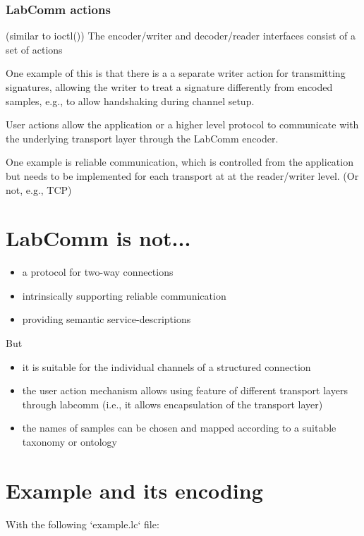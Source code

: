 \documentclass[a4paper]{article}
\begin{document}
\subsubsection{LabComm actions}

(similar to ioctl()) 
The encoder/writer and decoder/reader interfaces consist of a set of actions

One example of this is that there is a a separate writer action for
transmitting signatures, allowing the writer to treat a signature differently
from encoded samples, e.g., to allow handshaking during channel setup.

User actions allow the application or a higher level
protocol to communicate with the underlying transport layer through the LabComm
encoder. 

One example is reliable communication, which is controlled from the application
but needs to be implemented for each transport at at the reader/writer level.
(Or not, e.g., TCP)

\section{LabComm is not...}

\begin{itemize}
\item a protocol for two-way connections
\item intrinsically supporting reliable communication 
\item providing semantic service-descriptions
\end{itemize}

But

\begin{itemize}
\item it is suitable for the individual channels of a structured connection
\item the user action mechanism allows using feature of different transport layers
  through labcomm (i.e., it allows encapsulation of the transport layer)
\item the names of samples can be chosen and mapped according to a suitable taxonomy or ontology
\end{itemize}



\section{Example and its encoding}

With the following `example.lc` file:
\end{document}
